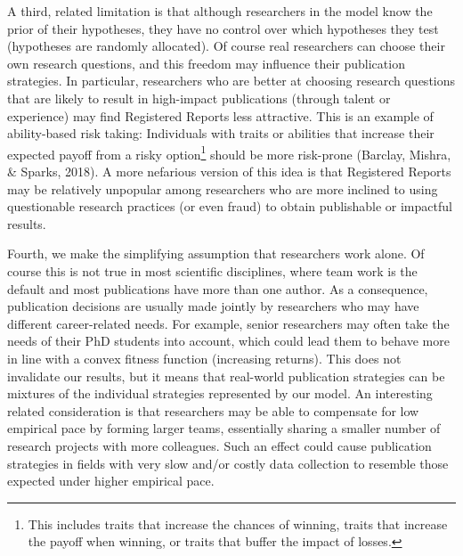 \documentclass[
  ,man,mask,floatsintext]{apa6}
\begin{document}
A third, related limitation is that although researchers in the model know the prior of their hypotheses, they have no control over
which hypotheses they test (hypotheses are randomly allocated).
Of course real researchers can choose their own research questions, and this freedom may influence their publication strategies.
In particular, researchers who are better at choosing research questions that are likely to result in high-impact publications (through talent or experience) may find Registered Reports less attractive.
This is an example of ability-based risk taking:
Individuals with traits or abilities that increase their expected payoff from a risky option\footnote{This includes traits that increase the chances of winning, traits that increase the payoff when winning, or traits that buffer the impact of losses.} should be more risk-prone (Barclay, Mishra, \& Sparks, 2018).
A more nefarious version of this idea is that Registered Reports may be relatively unpopular among researchers who are more inclined to using questionable research practices (or even fraud) to obtain publishable or impactful results.

Fourth, we make the simplifying assumption that researchers work alone.
Of course this is not true in most scientific disciplines, where team work is the default and most publications have more than one author.
As a consequence, publication decisions are usually made jointly by researchers who may have different career-related needs.
For example, senior researchers may often take the needs of their PhD students into account, which could lead them to behave more in line with a convex fitness function (increasing returns).
This does not invalidate our results, but it means that
real-world publication strategies can be mixtures of the individual strategies represented by our model.
An interesting related consideration is that researchers may be able to compensate for low empirical pace by forming larger teams, essentially sharing a smaller number of research projects with more colleagues.
Such an effect could cause publication strategies in fields with very slow and/or costly data collection to resemble those expected under higher empirical pace.
\end{document}
